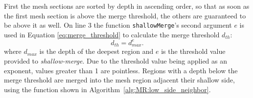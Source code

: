 First the mesh sections are sorted by depth in ascending order, so that as soon as the first mesh section is above the merge threshold, the others are guaranteed to be above it as well.
On line 3 the function \verb|shallowMerge|'s second argument $e$ is used in Equation \ref{eq:merge_threshold} to calculate the merge threshold $d_{th}$:
\begin{equation}\label{eq:merge_threshold}
	d_{th} = d_{max}^{e}.
\end{equation}
where $d_{max}$ is the depth of the deepest region and $e$ is the threshold value provided to \textit{shallow-merge}.
Due to the threshold value being applied as an exponent, values greater than 1 are pointless.
Regions with a depth below the merge threshold are merged into the mesh region adjacent their shallow side, using the function shown in Algorithm~\ref{alg:MR:low_side_neighbor}.

